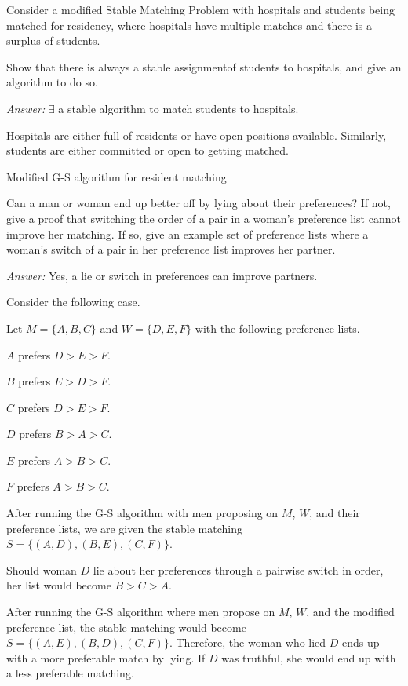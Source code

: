 \documentclass[12pt]{article}
\newenvironment{problem}[2][Problem]{\begin{trivlist}
\item[\hskip \labelsep {\bfseries #1}\hskip \labelsep {\bfseries #2.}]}{\end{trivlist}}
\begin{document}
\begin{problem}{3}
Consider a modified Stable Matching Problem with hospitals and students being matched for residency, where hospitals have multiple matches and there is a surplus of students.

Show that there is always a stable assignmentof students to hospitals, and give an algorithm to do so.
\end{problem}

\textit{Answer: } $\exists$ a stable algorithm to match students to hospitals.

Hospitals are either full of residents or have open positions available. Similarly, students are either committed or open to getting matched.

\begin{algorithm}
\caption{Modified G-S algorithm for resident matching}
\begin{algorithmic}
		\Else
		\EndIf
	\EndIf
\EndWhile
\end{algorithmic}
\end{algorithm}

\begin{problem}{4}
Can a man or woman end up better off by lying about their preferences? If not, give a proof that switching the order of a pair in a woman's preference list cannot improve her matching. If so, give an example set of preference lists where a woman's switch of a pair in her preference list improves her partner.
\end{problem}
\newpage
\textit{Answer: } Yes, a lie or switch in preferences can improve partners.

Consider the following case.

Let $M = \{A, B, C\}$ and $W = \{D, E, F\}$ with the following preference lists.

$A$ prefers $D > E > F$.

$B$ prefers $E > D > F$.

$C$ prefers $D > E > F$.

$D$ prefers $B > A > C$.

$E$ prefers $A > B > C$.

$F$ prefers $A > B > C$.

After running the G-S algorithm with men proposing on $M$, $W$, and their preference lists, we are given the stable matching $S = \{(A,D),(B,E),(C,F)\}$.

Should woman $D$ lie about her preferences through a pairwise switch in order, her list would become $B > C > A$.

After running the G-S algorithm where men propose on $M$, $W$, and the modified preference list, the stable matching would become $S = \{(A,E),(B,D),(C,F)\}$. Therefore, the woman who lied $D$ ends up with a more preferable match by lying. If $D$ was truthful, she would end up with a less preferable matching. 
\end{document}
